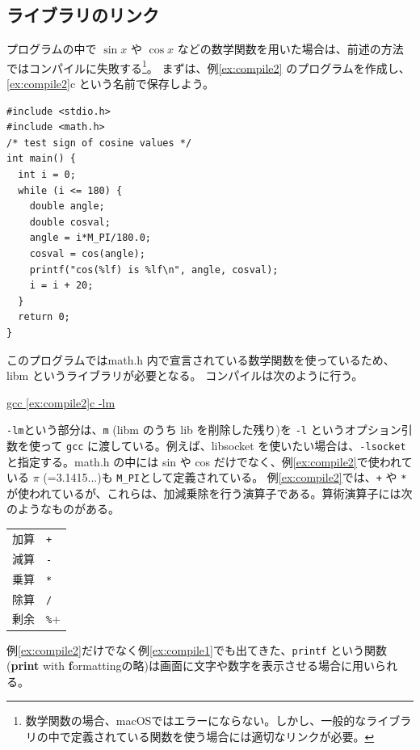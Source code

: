\subsection{ライブラリのリンク}
プログラムの中で $\sin x$ や $\cos x$ などの数学関数を用いた場合は、前述の方法ではコンパイルに失敗する\footnote{数学関数の場合、macOSではエラーにならない。しかし、一般的なライブラリの中で定義されている関数を使う場合には適切なリンクが必要。}。
まずは、例\ref{ex:compile2} のプログラムを作成し、\ref{ex:compile2}c という名前で保存しよう。
\begin{reidai}\label{ex:compile2}
\begin{verbatim}
#include <stdio.h>
#include <math.h>
/* test sign of cosine values */
int main() {
  int i = 0;
  while (i <= 180) {
    double angle;
    double cosval;
    angle = i*M_PI/180.0;
    cosval = cos(angle);
    printf("cos(%lf) is %lf\n", angle, cosval);
    i = i + 20;
  }
  return 0;
}
\end{verbatim}
\end{reidai} \noindent
このプログラムではmath.h 内で宣言されている数学関数を使っているため、libm というライブラリが必要となる。
コンパイルは次のように行う。
\begin{commandline2}
\prompt \underline{gcc \ref{ex:compile2}c -lm}
\end{commandline2} \noindent
\verb+-lm+という部分は、\verb+m+ (libm のうち lib を削除した残り)を \verb+-l+ というオプション引数を使って \verb+gcc+ に渡している。例えば、libsocket を使いたい場合は、\verb+-lsocket+ と指定する。math.h の中には sin や cos だけでなく、例\ref{ex:compile2}で使われている $\pi$ (=3.1415...)も \verb+M_PI+として定義されている。
例\ref{ex:compile2}では、\verb|+| や \verb+*+ が使われているが、これらは、加減乗除を行う演算子である。算術演算子には次のようなものがある。
\begin{table}[H]
\begin{center}
\begin{tabular}{ll}
  加算 & \verb|+| \\
  減算 & \verb+-+ \\
  乗算 & \verb+*+ \\
  除算 & \verb+/+ \\
  剰余 & \verb+%+
\end{tabular}
\end{center}
\end{table} \noindent
例\ref{ex:compile2}だけでなく例\ref{ex:compile1}でも出てきた、\verb+printf+ という関数(\textbf{print} with \textbf{f}ormattingの略)は画面に文字や数字を表示させる場合に用いられる。
